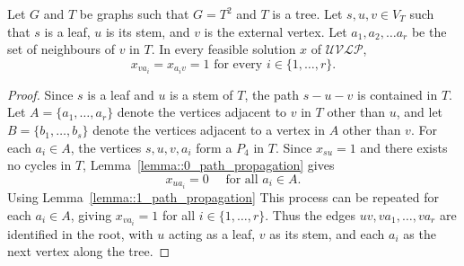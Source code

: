 
\begin{lemma}[Propagation] \label{lemma::propagation}
  Let $G$ and $T$ be graphs such that $G=T^2$ and $T$ is a tree. Let $s,u,v \in V_T$ such that $s$ is a leaf, $u$ is its stem, and $v$ is the external vertex. Let $a_1,a_2,\dots a_r$ be the set of neighbours of $v$ in $T$. In every feasible solution $x$ of $\mathcal{UVLP}$, 
  \[
  x_{va_i}=x_{a_iv}=1 \text{ for every } i \in \{1,\ldots,r\}. 
  \]
\end{lemma}
\begin{proof}
  Since $s$ is a leaf and $u$ is a stem of $T$, the path $s-u-v$ is contained in $T$. Let $A=\{a_1,\ldots,a_r\}$ denote the vertices adjacent to $v$ in $T$ other than $u$, and let $B=\{b_1,\ldots,b_s\}$ denote the vertices adjacent to a vertex in $A$ other than $v$. For each $a_i\in A$, the vertices $s,u,v,a_i$ form a $P_4$ in $T$. Since $x_{su}=1$ and there exists no cycles in $T$, Lemma~\eqref{lemma::0_path_propagation} gives
  \[
  x_{ua_i}=0 \quad \text{ for all } a_i \in A.
  \]
  Using Lemma~\eqref{lemma::1_path_propagation} 
  This process can be repeated for each $a_i\in A$, giving $x_{va_i}=1$ for all $i\in\{1,\ldots,r\}$. Thus the edges $uv, va_1,\ldots,va_r$ are identified in the root, with $u$ acting as a leaf, $v$ as its stem, and each $a_i$ as the next vertex along the tree.
\end{proof}

